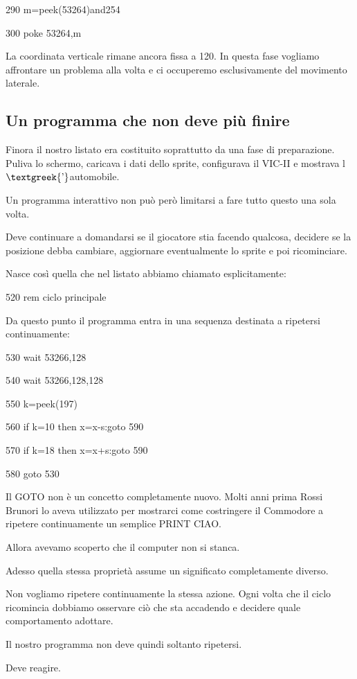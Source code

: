 \documentclass{article}
\begin{document}
290 m=peek(53264)and254

300 poke 53264,m

La coordinata verticale rimane ancora fissa a 120. In questa fase vogliamo affrontare un problema alla volta e ci
occuperemo esclusivamente del movimento laterale.

\subsection{Un programma che non deve più finire}
Finora il nostro listato era costituito soprattutto da una fase di preparazione. Puliva lo schermo, caricava i dati
dello sprite, configurava il VIC-II e mostrava l$\text{\textgreek{’}}$automobile.

Un programma interattivo non può però limitarsi a fare tutto questo una sola volta.

Deve continuare a domandarsi se il giocatore stia facendo qualcosa, decidere se la posizione debba cambiare, aggiornare
eventualmente lo sprite e poi ricominciare.

Nasce così quella che nel listato abbiamo chiamato esplicitamente:

520 rem ciclo principale

Da questo punto il programma entra in una sequenza destinata a ripetersi continuamente:

530 wait 53266,128

540 wait 53266,128,128

550 k=peek(197)

560 if k=10 then x=x-s:goto 590

570 if k=18 then x=x+s:goto 590

580 goto 530

Il GOTO non è un concetto completamente nuovo. Molti anni prima Rossi Brunori lo aveva utilizzato per mostrarci come
costringere il Commodore a ripetere continuamente un semplice PRINT {\textquotedbl}CIAO{\textquotedbl}.

Allora avevamo scoperto che il computer non si stanca.

Adesso quella stessa proprietà assume un significato completamente diverso.

Non vogliamo ripetere continuamente la stessa azione. Ogni volta che il ciclo ricomincia dobbiamo osservare ciò che sta
accadendo e decidere quale comportamento adottare.

Il nostro programma non deve quindi soltanto ripetersi.

Deve reagire.
\end{document}
